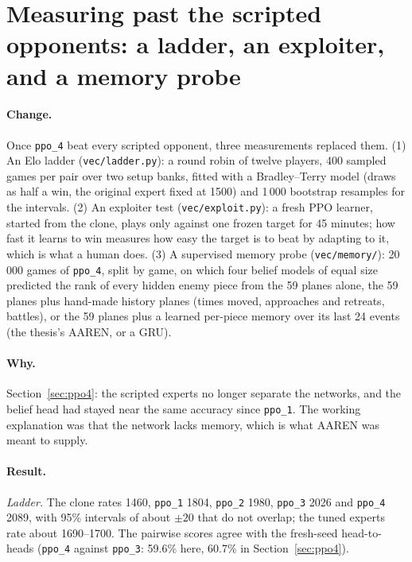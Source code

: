 \section{Measuring past the scripted opponents: a ladder, an exploiter, and a memory probe}
\label{sec:phase-a}

\paragraph{Change.} Once \texttt{ppo\_4} beat every scripted opponent, three measurements replaced
them. (1) An Elo ladder (\texttt{vec/ladder.py}): a round robin of twelve players, 400 sampled games
per pair over two setup banks, fitted with a Bradley--Terry model (draws as half a win, the original
expert fixed at 1500) and 1\,000 bootstrap resamples for the intervals. (2) An exploiter test
(\texttt{vec/exploit.py}): a fresh PPO learner, started from the clone, plays only against one
frozen target for 45 minutes; how fast it learns to win measures how easy the target is to beat
by adapting to it, which is what a human does. (3) A supervised memory probe
(\texttt{vec/memory/}): 20\,000 games of \texttt{ppo\_4}, split by game, on which four belief
models of equal size predicted the rank of every hidden enemy piece from the 59 planes alone, the
59 planes plus hand-made history planes (times moved, approaches and retreats, battles), or the 59
planes plus a learned per-piece memory over its last 24 events (the thesis's AAREN, or a GRU).

\paragraph{Why.} Section~\ref{sec:ppo4}: the scripted experts no longer separate the networks, and
the belief head had stayed near the same accuracy since \texttt{ppo\_1}. The working explanation
was that the network lacks memory, which is what AAREN was meant to supply.

\paragraph{Result.} \emph{Ladder.} The clone rates 1460, \texttt{ppo\_1} 1804, \texttt{ppo\_2}
1980, \texttt{ppo\_3} 2026 and \texttt{ppo\_4} 2089, with 95\% intervals of about $\pm 20$ that
do not overlap; the tuned experts rate about 1690--1700. The pairwise scores agree with the
fresh-seed head-to-heads (\texttt{ppo\_4} against \texttt{ppo\_3}: 59.6\% here, 60.7\% in
Section~\ref{sec:ppo4}).

